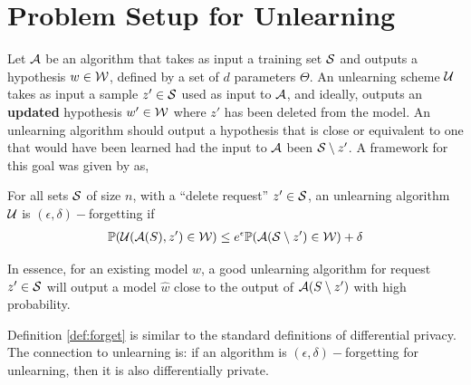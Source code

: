 \section{Problem Setup for Unlearning}
Let $\mathcal{A}$ be an algorithm that takes as input a training set $\mathcal{S}$ and outputs a hypothesis $w \in \mathcal{W}$, defined by a set of $d$ parameters $\Theta$. 
An unlearning scheme $\mathcal{U}$ takes as input a sample $z' \in \mathcal{S}$ used as input to $\mathcal{A}$, and ideally, outputs an \textbf{updated} hypothesis $w' \in \mathcal{W}$ where $z'$ has been deleted from the model.
%
%
An unlearning algorithm should output a hypothesis that is close or equivalent to one that would have been learned had the input to $\mathcal{A}$ been $\mathcal{S} \setminus z^\prime$. A framework for this goal was given by \cite{ginart2019making} as,
\begin{definition}\label{def:forget}
For all sets $\mathcal{S}$ of size $n$, with a ``delete request'' $z' \in \mathcal{S}$, an unlearning algorithm $\mathcal{U}$ is $(\epsilon, \delta)-$forgetting if
\begin{align}
\mathbb{P}(\mathcal{U}(\mathcal{A}(S), z') \in \mathcal{W}) \leq e^\epsilon\mathbb{P}(\mathcal{A}(\mathcal{S}\setminus z') \in \mathcal{W}) + \delta
\end{align}
\end{definition}
In essence, for an existing model $w$, a good unlearning algorithm for request $z' \in \mathcal{S}$ will output a model $\hat{w}$ close to the output of $\mathcal{A}(S \setminus z')$ with high probability.

\begin{remark}
Definition \ref{def:forget} is similar to the standard definitions of differential privacy. The connection to unlearning is: if an algorithm is $(\epsilon, \delta)-$forgetting for unlearning, then it is also differentially private. 
\end{remark}

